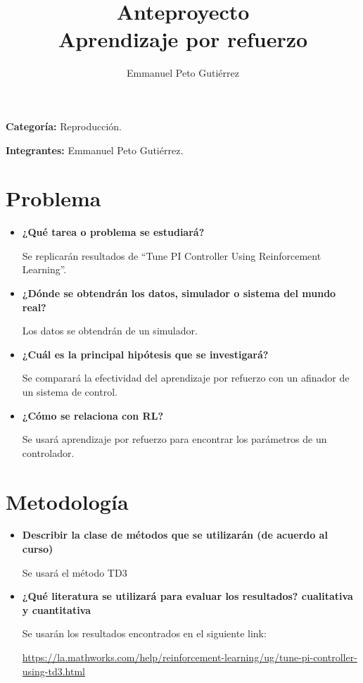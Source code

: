 \documentclass{article}
\title{Anteproyecto\\Aprendizaje por refuerzo}
\author{Emmanuel Peto Gutiérrez}
\begin{document}
\maketitle

\textbf{Categoría:} Reproducción.

\textbf{Integrantes:} Emmanuel Peto Gutiérrez.

\section{Problema}

\begin{itemize}

\item \textbf{¿Qué tarea o problema se estudiará?}

Se replicarán resultados de ``Tune PI Controller Using Reinforcement Learning''.

\item \textbf{¿Dónde se obtendrán los datos, simulador o sistema del mundo real?}

Los datos se obtendrán de un simulador.

\item \textbf{¿Cuál es la principal hipótesis que se investigará?}

Se comparará la efectividad del aprendizaje por refuerzo con un afinador de un sistema de control.

\item \textbf{¿Cómo se relaciona con RL?}

Se usará aprendizaje por refuerzo para encontrar los parámetros de un controlador.

\end{itemize}

\section{Metodología}

\begin{itemize}

\item \textbf{Describir la clase de métodos que se utilizarán (de acuerdo al curso)}

Se usará el método TD3

\item \textbf{¿Qué literatura se utilizará para evaluar los resultados? cualitativa y cuantitativa}

Se usarán los resultados encontrados en el siguiente link:

\url{https://la.mathworks.com/help/reinforcement-learning/ug/tune-pi-controller-using-td3.html}

\end{itemize}
\end{document}

